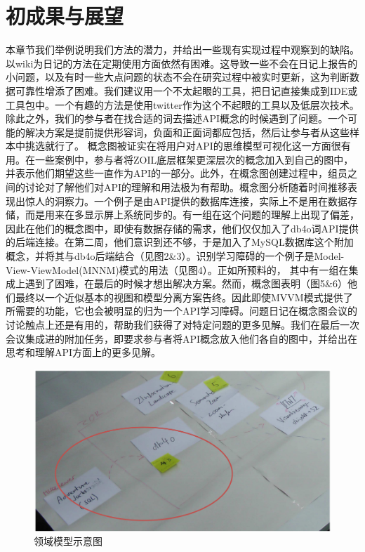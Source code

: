 \section*{初成果与展望}
本章节我们举例说明我们方法的潜力，并给出一些现有实现过程中观察到的缺陷。
以wiki为日记的方法在定期使用方面依然有困难。这导致一些不会在日记上报告的小问题，以及有时一些大点问题的状态不会在研究过程中被实时更新，这为判断数据可靠性增添了困难。我们建议用一个不太起眼的工具，把日记直接集成到IDE或工具包中。一个有趣的方法是使用twitter作为这个不起眼的工具以及低层次技术。除此之外，我们的参与者在找合适的词去描述API概念的时候遇到了问题。一个可能的解决方案是提前提供形容词，负面和正面词都应包括，然后让参与者从这些样本中挑选就行了。
概念图被证实在将用户对API的思维模型可视化这一方面很有用。在一些案例中，参与者将ZOIL底层框架更深层次的概念加入到自己的图中，并表示他们期望这些一直作为API的一部分。此外，在概念图创建过程中，组员之间的讨论对了解他们对API的理解和用法极为有帮助。概念图分析随着时间推移表现出惊人的洞察力。一个例子是由API提供的数据库连接，实际上不是用在数据存储，而是用来在多显示屏上系统同步的。有一组在这个问题的理解上出现了偏差，因此在他们的概念图中，即使有数据存储的需求，他们仅仅加入了db4o词API提供的后端连接。在第二周，他们意识到还不够，于是加入了MySQL数据库这个附加概念，并将其与db4o后端结合（见图2\&3）。识别学习障碍的一个例子是Model-View-ViewModel(MNNM)模式的用法（见图4）。正如所预料的， 其中有一组在集成上遇到了困难，在最后的时候才想出解决方案。然而，概念图表明（图5\&6）他们最终以一个近似基本的视图和模型分离方案告终。因此即使MVVM模式提供了所需要的功能，它也会被明显的归为一个API学习障碍。问题日记在概念图会议的讨论触点上还是有用的，帮助我们获得了对特定问题的更多见解。我们在最后一次会议集成进的附加任务，即要求参与者将API概念放入他们各自的图中，并给出在思考和理解API方面上的更多见解。
\begin{figure}[!hbp]
  \begin{center}
    \includegraphics[scale=0.3]{figures/translation/translation_api_fig2.png}\\
    领域模型示意图
  \end{center}
\end{figure}

